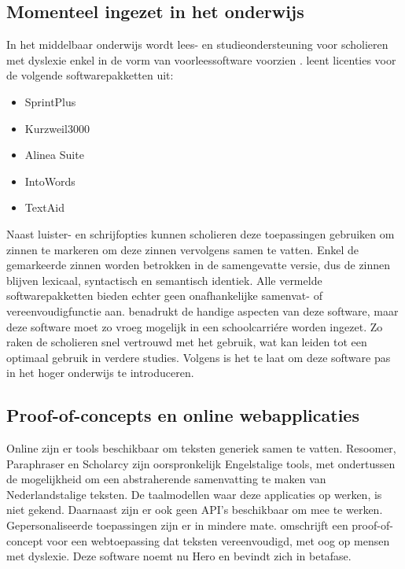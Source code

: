 \subsection{Momenteel ingezet in het onderwijs}

In het middelbaar onderwijs wordt lees- en studieondersteuning voor scholieren met dyslexie enkel in de vorm van voorleessoftware voorzien \autocite{DeCraemer2018, OnderwijsVlaanderen2023}. \textcite{OnderwijsVlaanderen2023} leent licenties voor de volgende softwarepakketten uit:

\begin{itemize}
	\item SprintPlus
	\item Kurzweil3000
	\item Alinea Suite
	\item IntoWords
	\item TextAid
\end{itemize}

Naast luister- en schrijfopties kunnen scholieren deze toepassingen gebruiken om zinnen te markeren om deze zinnen vervolgens samen te vatten. Enkel de gemarkeerde zinnen worden betrokken in de samengevatte versie, dus de zinnen blijven lexicaal, syntactisch en semantisch identiek. Alle vermelde softwarepakketten bieden echter geen onafhankelijke samenvat- of vereenvoudigfunctie aan. \textcite{Tops2018} benadrukt de handige aspecten van deze software, maar deze software moet zo vroeg mogelijk in een schoolcarriére worden ingezet. Zo raken de scholieren snel vertrouwd met het gebruik, wat kan leiden tot een optimaal gebruik in verdere studies. Volgens \textcite{Tops2018} is het te laat om deze software pas in het hoger onderwijs te introduceren.

\subsection{Proof-of-concepts en online webapplicaties}

Online zijn er tools beschikbaar om teksten generiek samen te vatten. Resoomer, Paraphraser en Scholarcy zijn oorspronkelijk Engelstalige tools, met ondertussen de mogelijkheid om een abstraherende samenvatting te maken van Nederlandstalige teksten. De taalmodellen waar deze applicaties op werken, is niet gekend. Daarnaast zijn er ook geen API's beschikbaar om mee te werken. Gepersonaliseerde toepassingen zijn er in mindere mate. \textcite{Bingel2018} omschrijft een proof-of-concept voor een webtoepassing dat teksten vereenvoudigd, met oog op mensen met dyslexie. Deze software noemt nu Hero en bevindt zich in betafase.

